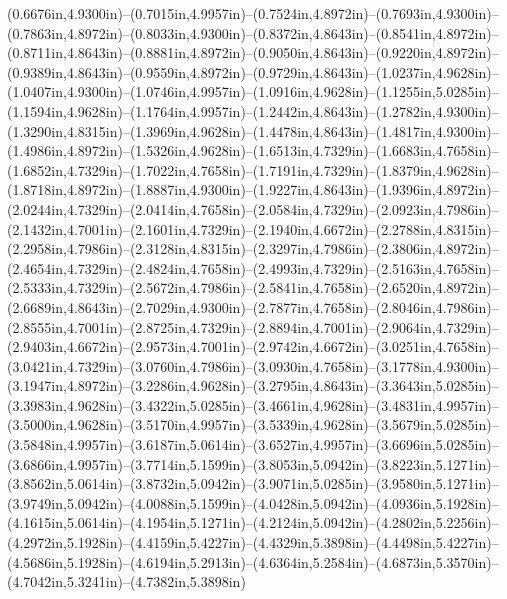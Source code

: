 (0.6676in,4.9300in)--(0.7015in,4.9957in)--(0.7524in,4.8972in)--(0.7693in,4.9300in)--(0.7863in,4.8972in)--(0.8033in,4.9300in)--(0.8372in,4.8643in)--(0.8541in,4.8972in)--(0.8711in,4.8643in)--(0.8881in,4.8972in)--(0.9050in,4.8643in)--(0.9220in,4.8972in)--(0.9389in,4.8643in)--(0.9559in,4.8972in)--(0.9729in,4.8643in)--(1.0237in,4.9628in)--(1.0407in,4.9300in)--(1.0746in,4.9957in)--(1.0916in,4.9628in)--(1.1255in,5.0285in)--(1.1594in,4.9628in)--(1.1764in,4.9957in)--(1.2442in,4.8643in)--(1.2782in,4.9300in)--(1.3290in,4.8315in)--(1.3969in,4.9628in)--(1.4478in,4.8643in)--(1.4817in,4.9300in)--(1.4986in,4.8972in)--(1.5326in,4.9628in)--(1.6513in,4.7329in)--(1.6683in,4.7658in)--(1.6852in,4.7329in)--(1.7022in,4.7658in)--(1.7191in,4.7329in)--(1.8379in,4.9628in)--(1.8718in,4.8972in)--(1.8887in,4.9300in)--(1.9227in,4.8643in)--(1.9396in,4.8972in)--(2.0244in,4.7329in)--(2.0414in,4.7658in)--(2.0584in,4.7329in)--(2.0923in,4.7986in)--(2.1432in,4.7001in)--(2.1601in,4.7329in)--(2.1940in,4.6672in)--(2.2788in,4.8315in)--(2.2958in,4.7986in)--(2.3128in,4.8315in)--(2.3297in,4.7986in)--(2.3806in,4.8972in)--(2.4654in,4.7329in)--(2.4824in,4.7658in)--(2.4993in,4.7329in)--(2.5163in,4.7658in)--(2.5333in,4.7329in)--(2.5672in,4.7986in)--(2.5841in,4.7658in)--(2.6520in,4.8972in)--(2.6689in,4.8643in)--(2.7029in,4.9300in)--(2.7877in,4.7658in)--(2.8046in,4.7986in)--(2.8555in,4.7001in)--(2.8725in,4.7329in)--(2.8894in,4.7001in)--(2.9064in,4.7329in)--(2.9403in,4.6672in)--(2.9573in,4.7001in)--(2.9742in,4.6672in)--(3.0251in,4.7658in)--(3.0421in,4.7329in)--(3.0760in,4.7986in)--(3.0930in,4.7658in)--(3.1778in,4.9300in)--(3.1947in,4.8972in)--(3.2286in,4.9628in)--(3.2795in,4.8643in)--(3.3643in,5.0285in)--(3.3983in,4.9628in)--(3.4322in,5.0285in)--(3.4661in,4.9628in)--(3.4831in,4.9957in)--(3.5000in,4.9628in)--(3.5170in,4.9957in)--(3.5339in,4.9628in)--(3.5679in,5.0285in)--(3.5848in,4.9957in)--(3.6187in,5.0614in)--(3.6527in,4.9957in)--(3.6696in,5.0285in)--(3.6866in,4.9957in)--(3.7714in,5.1599in)--(3.8053in,5.0942in)--(3.8223in,5.1271in)--(3.8562in,5.0614in)--(3.8732in,5.0942in)--(3.9071in,5.0285in)--(3.9580in,5.1271in)--(3.9749in,5.0942in)--(4.0088in,5.1599in)--(4.0428in,5.0942in)--(4.0936in,5.1928in)--(4.1615in,5.0614in)--(4.1954in,5.1271in)--(4.2124in,5.0942in)--(4.2802in,5.2256in)--(4.2972in,5.1928in)--(4.4159in,5.4227in)--(4.4329in,5.3898in)--(4.4498in,5.4227in)--(4.5686in,5.1928in)--(4.6194in,5.2913in)--(4.6364in,5.2584in)--(4.6873in,5.3570in)--(4.7042in,5.3241in)--(4.7382in,5.3898in)
